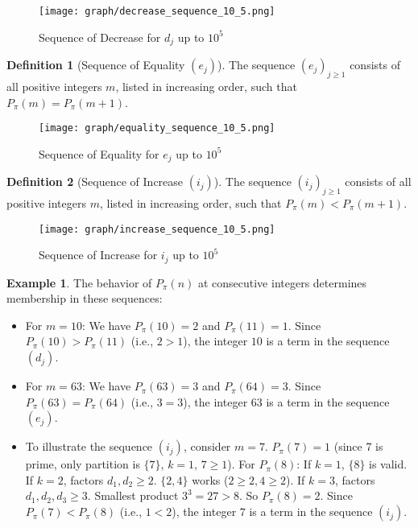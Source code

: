 \documentclass[]{article}
\theoremstyle{plain}%
\theoremstyle{definition}
\newtheorem{defn}{Definition}[section]
\newtheorem{exmp}{Example}[section]
\theoremstyle{remark}
\begin{document}
\begin{figure}[h]
	\caption{Sequence of Decrease for $d_j$ up to $10^5$}
	\centering
	\texttt{[image: graph/decrease\_sequence\_10\_5.png]}
\end{figure}

\begin{defn}[Sequence of Equality $(e_j)$]
	The sequence $(e_j)_{j \ge 1}$ consists of all positive integers $m$, listed in increasing order, such that $P_{\pi}(m) = P_{\pi}(m+1)$.
\end{defn}
\begin{figure}[h]
	\caption{Sequence of Equality for $e_j$ up to $10^5$}
	\centering
	\texttt{[image: graph/equality\_sequence\_10\_5.png]}
\end{figure}
\begin{defn}[Sequence of Increase $(i_j)$]
	The sequence $(i_j)_{j \ge 1}$ consists of all positive integers $m$, listed in increasing order, such that $P_{\pi}(m) < P_{\pi}(m+1)$.
\end{defn}
\begin{figure}[h]
	\caption{Sequence of Increase for $i_j$ up to $10^5$}
	\centering
	\texttt{[image: graph/increase\_sequence\_10\_5.png]}
\end{figure}
\begin{exmp}
	The behavior of $P_{\pi}(n)$ at consecutive integers determines membership in these sequences:
	\begin{itemize}
		\item For $m=10$: We have $P_{\pi}(10)=2$ and $P_{\pi}(11)=1$. Since $P_{\pi}(10) > P_{\pi}(11)$ (i.e., $2 > 1$), the integer $10$ is a term in the sequence $(d_j)$.
		
		\item For $m=63$: We have $P_{\pi}(63)=3$ and $P_{\pi}(64)=3$. Since $P_{\pi}(63) = P_{\pi}(64)$ (i.e., $3 = 3$), the integer $63$ is a term in the sequence $(e_j)$.
		
		\item To illustrate the sequence $(i_j)$, consider $m=7$.
		$P_{\pi}(7)=1$ (since 7 is prime, only partition is $\{7\}$, $k=1$, $7 \ge 1$).
		For $P_{\pi}(8)$: If $k=1$, $\{8\}$ is valid. If $k=2$, factors $d_1, d_2 \ge 2$. $\{2,4\}$ works ($2\ge 2, 4\ge 2$). If $k=3$, factors $d_1,d_2,d_3 \ge 3$. Smallest product $3^3=27 > 8$. So $P_{\pi}(8)=2$.
		Since $P_{\pi}(7) < P_{\pi}(8)$ (i.e., $1 < 2$), the integer $7$ is a term in the sequence $(i_j)$.
	\end{itemize}
\end{exmp}
\end{document}
